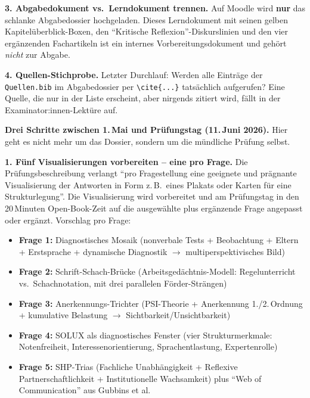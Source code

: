 \documentclass[ngerman, a4paper]{article}
\begin{document}
\begin{todomai}
\medskip
\textbf{3. Abgabedokument vs.\ Lerndokument trennen.}
Auf Moodle wird \textbf{nur} das schlanke Abgabedossier hochgeladen. Dieses Lerndokument mit seinen gelben Kapitelüberblick-Boxen, den \enquote{Kritische Reflexion}-Diskurslinien und den vier ergänzenden Fachartikeln ist ein internes Vorbereitungsdokument und gehört \textit{nicht} zur Abgabe.

\medskip
\textbf{4. Quellen-Stichprobe.}
Letzter Durchlauf: Werden alle Einträge der \texttt{Quellen.bib} im Abgabedossier per \verb|\cite{...}| tatsächlich aufgerufen? Eine Quelle, die nur in der Liste erscheint, aber nirgends zitiert wird, fällt in der Examinator:innen-Lektüre auf.
\end{todomai}

\begin{todojuni}
\textbf{Drei Schritte zwischen 1.\,Mai und Prüfungstag (11.\,Juni 2026).}
Hier geht es nicht mehr um das Dossier, sondern um die mündliche Prüfung selbst.

\medskip
\textbf{1. Fünf Visualisierungen vorbereiten -- eine pro Frage.}
Die Prüfungsbeschreibung verlangt \enquote{pro Fragestellung eine geeignete und prägnante Visualisierung der Antworten in Form z.\,B.\ eines Plakats oder Karten für eine Strukturlegung}. Die Visualisierung wird vorbereitet und am Prüfungstag in den 20\,Minuten Open-Book-Zeit auf die ausgewählte plus ergänzende Frage angepasst oder ergänzt. Vorschlag pro Frage:
\begin{itemize}\setlength{\itemsep}{0pt}
  \item \textbf{Frage 1:} Diagnostisches Mosaik (nonverbale Tests + Beobachtung + Eltern + Erstsprache + dynamische Diagnostik $\rightarrow$ multiperspektivisches Bild)
  \item \textbf{Frage 2:} Schrift-Schach-Brücke (Arbeitsgedächtnis-Modell: Regelunterricht vs.\ Schachnotation, mit drei parallelen Förder-Strängen)
  \item \textbf{Frage 3:} Anerkennungs-Trichter (PSI-Theorie + Anerkennung 1./2.\,Ordnung + kumulative Belastung $\rightarrow$ Sichtbarkeit/Unsichtbarkeit)
  \item \textbf{Frage 4:} SOLUX als diagnostisches Fenster (vier Strukturmerkmale: Notenfreiheit, Interessenorientierung, Sprachentlastung, Expertenrolle)
  \item \textbf{Frage 5:} SHP-Trias (Fachliche Unabhängigkeit + Reflexive Partnerschaftlichkeit + Institutionelle Wachsamkeit) plus \enquote{Web of Communication} aus Gubbins et al.
\end{itemize}


\end{todojuni}
\end{document}
